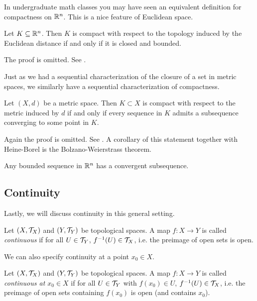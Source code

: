\documentclass{article}
\begin{document}
In undergraduate math classes you may have seen an equivalent definition for compactness on ${\mathbb{R}}^n$. This is a nice feature of Euclidean space.

\begin{theorem}
Let $K\subseteq {\mathbb{R}}^n$. Then $K$ is compact with respect to the topology induced by the Euclidean distance if and only if it is closed and bounded.
\end{theorem}

The proof is omitted. See \cite[Corollary 2.5.12]{tastetopology}.

Just as we had a sequential characterization of the closure of a set in metric spaces, we similarly have a sequential characterization of compactness. 

\begin{theorem}
Let $(X,d)$ be a metric space. Then $K\subset X$ is compact with respect to the metric induced by $d$ if and only if every sequence in $K$ admits a subsequence converging to some point in $K$.
\end{theorem}

Again the proof is omitted. See \cite[Theorem 2.5.10]{tastetopology}. A corollary of this statement together with Heine-Borel is the Bolzano-Weierstrass theorem.

\begin{corollary}
Any bounded sequence in ${\mathbb{R}}^n$ has a convergent subsequence.
\end{corollary}

\subsection{Continuity}

Lastly, we will discuss continuity in this general setting. 

\begin{definition}
Let $(X,\mathcal{T}_X)$ and $(Y,\mathcal{T}_Y)$ be topological spaces. A map $f\colon X \to Y$ is called \emph{continuous} if for all $U\in \mathcal{T}_Y$, $f^{-1}(U)\in \mathcal{T}_X$, i.e. the preimage of open sets is open. 
\end{definition}

We can also specify continuity at a point $x_0\in X$.

\begin{definition}
Let $(X,\mathcal{T}_X)$ and $(Y,\mathcal{T}_Y)$ be topological spaces. A map $f\colon X \to Y$ is called \emph{continuous at $x_0\in X$} if for all $U\in \mathcal{T}_Y$ with $f(x_0)\in U$, $f^{-1}(U)\in \mathcal{T}_X$, i.e. the preimage of open sets containing $f(x_0)$ is open (and contains $x_0$).
\end{definition}
\end{document}
